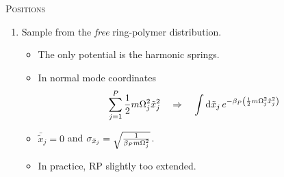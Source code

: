 \begin{frame}
\begin{columns}[t]
\begin{column}{0.48\textwidth}
\begin{block}{\centering \textsc{Positions}}
\begin{enumerate}
        \item Sample from the \emph{free} ring-polymer distribution.
          \begin{itemize}
          \item The only potential is the harmonic springs.
          \item In normal mode coordinates
            \begin{equation*}
              \sum_{j=1}^P \frac{1}{2}m\Omega_j^2\tilde{x}_j^2
              \quad\Rightarrow\quad
              \int\mathrm{d}\tilde{x}_j\, e^{-\beta_P\left({1\over2}m\Omega_j^2\tilde{x}_j^2\right)}
            \end{equation*}
            
          \item $\bar{\tilde{x}}_j = 0$ and $\sigma_{\tilde{x}_j} =
            \sqrt{1\over\beta_P m\Omega_j^2}$.
          \item In practice, RP slightly too extended.
          \end{itemize}
          
        \end{enumerate}
      \end{block}
    \end{column}
  \end{columns}
\end{frame}
